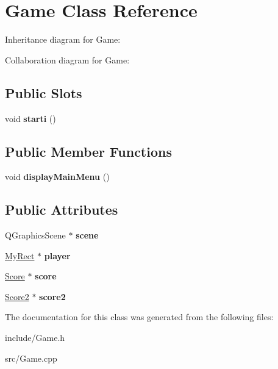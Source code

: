 \hypertarget{classGame}{}\section{Game Class Reference}
\label{classGame}


Inheritance diagram for Game\+:


Collaboration diagram for Game\+:
\subsection*{Public Slots}
\begin{DoxyCompactItemize}
\item 
\mbox{\label{classGame_a0a91fe46af80bd960d26d035887be4f5}} 
void {\bfseries starti} ()
\end{DoxyCompactItemize}
\subsection*{Public Member Functions}
\begin{DoxyCompactItemize}
\item 
\mbox{\label{classGame_af74fd203e3b31917ca9d4769fa608c48}} 
void {\bfseries display\+Main\+Menu} ()
\end{DoxyCompactItemize}
\subsection*{Public Attributes}
\begin{DoxyCompactItemize}
\item 
\mbox{\label{classGame_a8119e3b9a632906c6808fa294b46a92a}} 
Q\+Graphics\+Scene $\ast$ {\bfseries scene}
\item 
\mbox{\label{classGame_a566d67207f5555ec8f9f725c1284dd77}} 
\hyperlink{classMyRect}{My\+Rect} $\ast$ {\bfseries player}
\item 
\mbox{\label{classGame_ad195acc6b5ee17a5a07fea0b7b4ff5e2}} 
\hyperlink{classScore}{Score} $\ast$ {\bfseries score}
\item 
\mbox{\label{classGame_afa8c4e11ca66f4308d6460bb3ac17119}} 
\hyperlink{classScore2}{Score2} $\ast$ {\bfseries score2}
\end{DoxyCompactItemize}


The documentation for this class was generated from the following files\+:\begin{DoxyCompactItemize}
\item 
include/Game.\+h\item 
src/Game.\+cpp\end{DoxyCompactItemize}
